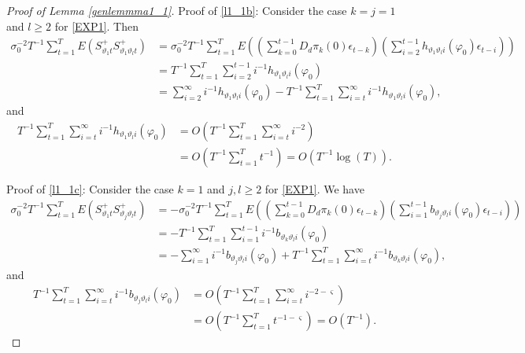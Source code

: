 {{\begin{proof}[Proof of Lemma \ref{genlemmma1_1}]
Proof of \eqref{l1_1b}: Consider the case $k=j =1$ and $l \geq 2$ for \eqref{EXP1}. Then 
\begin{align*}
    \sigma_0^{-2} T^{-1} \sum_{t = 1}^T  E \left( S_{\vartheta_1 t}^+ S_{\vartheta_1 \vartheta_l t}^+  \right) &=   \sigma_0^{-2} T^{-1} \sum_{t = 1}^T  E \left( \left( \sum_{k = 0}^{t-1} D_d \pi_{k}(0) \epsilon_{t-k} \right) \left( \sum_{i = 2}^{t-1} h_{\vartheta_1 \vartheta_l i}(\varphi_0)  \epsilon_{t-i} \right) \right) \\
    &=    T^{-1} \sum_{t = 1}^T  \sum_{i = 2}^{t-1}  i^{-1}  h_{\vartheta_1 \vartheta_l i}(\varphi_0) \\
    &=     \sum_{i = 2}^{\infty} i^{-1} h_{\vartheta_1 \vartheta_l i}(\varphi_0) - T^{-1} \sum_{t = 1}^T  \sum_{i = t}^{\infty}  i^{-1} h_{\vartheta_1 \vartheta_l i}(\varphi_0),
\end{align*}
and 
\begin{align*}
   T^{-1} \sum_{t = 1}^T  \sum_{i = t}^{\infty} i^{-1} h_{\vartheta_1 \vartheta_l i}(\varphi_0) &= O( T^{-1} \sum_{t = 1}^T  \sum_{i = t}^{\infty}  i^{-2} ) \\
    &=  O( T^{-1} \sum_{t = 1}^T    t^{-1} ) =  O( T^{-1} \log(T)) .
\end{align*}


Proof of \eqref{l1_1c}: Consider the case $k= 1$ and $j,l \geq 2$ for \eqref{EXP1}. We have 
\begin{align*}
    \sigma_0^{-2} T^{-1} \sum_{t = 1}^T  E \left( S_{\vartheta_1 t}^+ S_{\vartheta_j \vartheta_l t}^+  \right) &=  -  \sigma_0^{-2} T^{-1} \sum_{t = 1}^T  E \left( \left( \sum_{k = 0}^{t-1} D_d \pi_{k}(0) \epsilon_{t-k} \right) \left(\sum_{i = 1}^{t-1} b_{\vartheta_j \vartheta_l i}(\varphi_0)  \epsilon_{t-i} \right) \right) \\
    &=  -  T^{-1} \sum_{t = 1}^T  \sum_{i = 1}^{t-1}  i^{-1}  b_{\vartheta_k \vartheta_l i}(\varphi_0) \\
    &= -    \sum_{i = 1}^{\infty}  i^{-1} b_{\vartheta_j \vartheta_l i}(\varphi_0) +  T^{-1} \sum_{t = 1}^T  \sum_{i = t}^{\infty}   i^{-1} b_{\vartheta_k \vartheta_l i}(\varphi_0) ,
\end{align*}
and 
\begin{align*}
 T^{-1} \sum_{t = 1}^T  \sum_{i = t}^{\infty}   i^{-1} b_{\vartheta_j \vartheta_l i}(\varphi_0) &= O( T^{-1} \sum_{t = 1}^T  \sum_{i = t}^{\infty}  i^{-2-\varsigma} ) \\
 &= O( T^{-1} \sum_{t = 1}^T    t^{-1-\varsigma} ) = O( T^{-1}) .
\end{align*}


\end{proof}}}
